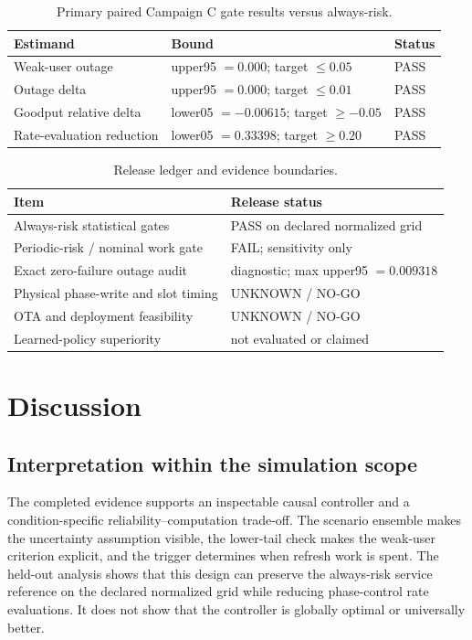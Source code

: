 \documentclass[10pt,twocolumn]{article}
\begin{document}
\begin{table}[t]
\caption{Primary paired Campaign C gate results versus always-risk.}
\label{tab:gates}
\scriptsize
\begin{tabularx}{\columnwidth}{@{}p{} X p{}@{}}
\toprule
Estimand & Bound & Status \\
\midrule
Weak-user outage & upper95 $=0.000$; target $\leq0.05$ & PASS \\
Outage delta & upper95 $=0.000$; target $\leq0.01$ & PASS \\
Goodput relative delta & lower05 $=-0.00615$; target $\geq-0.05$ & PASS \\
Rate-evaluation reduction & lower05 $=0.33398$; target $\geq0.20$ & PASS \\
\bottomrule
\end{tabularx}
\end{table}

\begin{table}[t]
\caption{Release ledger and evidence boundaries.}
\label{tab:release}
\scriptsize
\begin{tabularx}{\columnwidth}{@{}l X@{}}
\toprule
Item & Release status \\
\midrule
Always-risk statistical gates & PASS on declared normalized grid \\
Periodic-risk / nominal work gate & FAIL; sensitivity only \\
Exact zero-failure outage audit & diagnostic; max upper95 $=0.009318$ \\
Physical phase-write and slot timing & UNKNOWN / NO-GO \\
OTA and deployment feasibility & UNKNOWN / NO-GO \\
Learned-policy superiority & not evaluated or claimed \\
\bottomrule
\end{tabularx}
\end{table}

\section{Discussion}\label{discussion}

\subsection{Interpretation within the simulation
scope}\label{interpretation-within-the-simulation-scope}

The completed evidence supports an inspectable causal controller and a
condition-specific reliability--computation trade-off. The scenario
ensemble makes the uncertainty assumption visible, the lower-tail check
makes the weak-user criterion explicit, and the trigger determines when
refresh work is spent. The held-out analysis shows that this design can
preserve the always-risk service reference on the declared normalized
grid while reducing phase-control rate evaluations. It does not show
that the controller is globally optimal or universally better.
\end{document}
